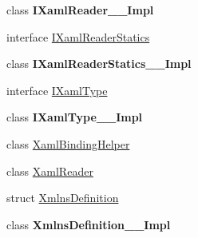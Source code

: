 \begin{DoxyCompactItemize}
\item 
class {\bfseries I\+Xaml\+Reader\+\_\+\+\_\+\+Impl}
\item 
interface \hyperlink{interface_windows_1_1_u_i_1_1_xaml_1_1_markup_1_1_i_xaml_reader_statics}{I\+Xaml\+Reader\+Statics}
\item 
class {\bfseries I\+Xaml\+Reader\+Statics\+\_\+\+\_\+\+Impl}
\item 
interface \hyperlink{interface_windows_1_1_u_i_1_1_xaml_1_1_markup_1_1_i_xaml_type}{I\+Xaml\+Type}
\item 
class {\bfseries I\+Xaml\+Type\+\_\+\+\_\+\+Impl}
\item 
class \hyperlink{class_windows_1_1_u_i_1_1_xaml_1_1_markup_1_1_xaml_binding_helper}{Xaml\+Binding\+Helper}
\item 
class \hyperlink{class_windows_1_1_u_i_1_1_xaml_1_1_markup_1_1_xaml_reader}{Xaml\+Reader}
\item 
struct \hyperlink{struct_windows_1_1_u_i_1_1_xaml_1_1_markup_1_1_xmlns_definition}{Xmlns\+Definition}
\item 
class {\bfseries Xmlns\+Definition\+\_\+\+\_\+\+Impl}
\end{DoxyCompactItemize}
